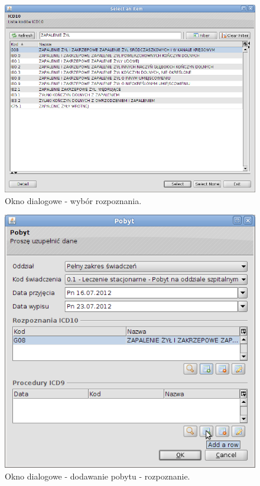 \begin{figure}%
\centering
\includegraphics[scale=0.4]{images/gruper3}
\caption[Widok grupera]{Okno dialogowe - wybór rozpoznania.}
\label{img:gruper3}
\end{figure}

\begin{figure}%
\centering
\includegraphics[scale=0.4]{images/gruper4}
\caption[Widok grupera]{Okno dialogowe - dodawanie pobytu - rozpoznanie.}
\label{img:gruper4}
\end{figure}

